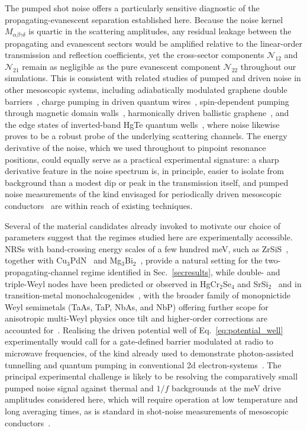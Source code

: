\documentclass[aps,prb,onecolumn,longbibliography,nofootinbib,citeautoscript,10pt]{revtex4-2}
\begin{document}
The pumped shot noise offers a particularly sensitive diagnostic of the propagating-evanescent separation established here. Because the noise kernel $M_{\alpha\beta\gamma\delta}$ is quartic in the scattering amplitudes, any residual leakage between the propagating and evanescent sectors would be amplified relative to the linear-order transmission and reflection coefficients, yet the cross-sector components $\mathcal{N}_{12}$ and $\mathcal{N}_{21}$ remain as negligible as the pure evanescent component $\mathcal{N}_{22}$ throughout our simulations. This is consistent with related studies of pumped and driven noise in other mesoscopic systems, including adiabatically modulated graphene double barriers~\cite{Zhu_2011},  charge pumping in driven quantum wires~\cite{Zhu02},  spin-dependent pumping through magnetic domain walls~\cite{Zhu10},  harmonically driven ballistic graphene~\cite{shot_noise},  and the edge states of inverted-band HgTe quantum wells~\cite{shot_hg},  where noise likewise proves to be a robust probe of the underlying scattering channels. The energy derivative of the noise, which we used throughout to pinpoint resonance positions, could equally serve as a practical experimental signature: a sharp derivative feature in the noise spectrum is, in principle, easier to isolate from background than a modest dip or peak in the transmission itself, and pumped noise measurements of the kind envisaged for periodically driven mesoscopic conductors~\cite{platero2004,kamenev00} are within reach of existing techniques.

Several of the material candidates already invoked to motivate our choice of parameters suggest that the regimes studied here are experimentally accessible. NRSs with band-crossing energy scales of a few hundred meV, such as ZrSiS~\cite{fu_nodal19},  together with Cu$_3$PdN~\cite{xiao_nodal15} and Mg$_3$Bi$_2$~\cite{chang_nodal19},  provide a natural setting for the two-propagating-channel regime identified in Sec.~\ref{secresults}, while double- and triple-Weyl nodes have been predicted or observed in HgCr$_2$Se$_4$ and SrSi$_2$~\cite{Gang2011, hasan_mweyl16} and in transition-metal monochalcogenides~\cite{liu2017predicted},  with the broader family of monopnictide Weyl semimetals (TaAs, TaP, NbAs, and NbP) offering further scope for anisotropic multi-Weyl physics once tilt and higher-order corrections are accounted for~\cite{grassano18, grassano20}. Realising the driven potential well of Eq.~\eqref{eq:potential_well} experimentally would call for a gate-defined barrier modulated at radio to microwave frequencies, of the kind already used to demonstrate photon-assisted tunnelling and quantum pumping in conventional 2d electron-systems~\cite{oosterkamp98, blumenthal07, dicarlo03, switkes99}. The principal experimental challenge is likely to be resolving the comparatively small pumped noise signal against thermal and $1/f$ backgrounds at the meV drive amplitudes considered here, which will require operation at low temperature and long averaging times, as is standard in shot-noise measurements of mesoscopic conductors~\cite{beenakker03}.
\end{document}
